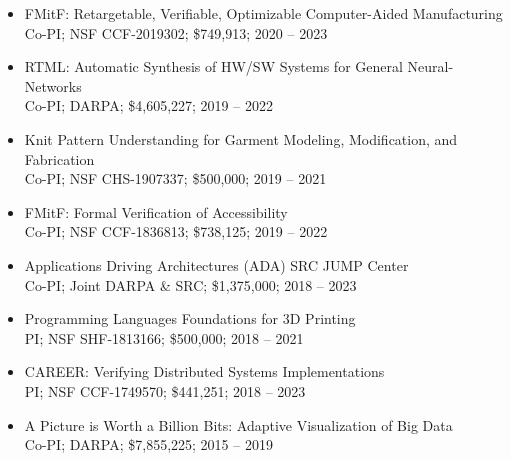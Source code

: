 \documentclass[10pt]{article}
\begin{document}
\begin{itemize}
  \item
    FMitF: Retargetable, Verifiable, Optimizable Computer-Aided Manufacturing \\
    Co-PI; NSF CCF-2019302; \$749,913; 2020 -- 2023

  \item
    RTML: Automatic Synthesis of HW/SW Systems for General Neural-Networks \\
    Co-PI; DARPA; \$4,605,227; 2019 -- 2022

  \item
    Knit Pattern Understanding for Garment Modeling, Modification, and Fabrication \\
    Co-PI; NSF CHS-1907337; \$500,000; 2019 -- 2021

  \item
    FMitF: Formal Verification of Accessibility \\
    Co-PI; NSF CCF-1836813; \$738,125; 2019 -- 2022

  \item
    Applications Driving Architectures (ADA) SRC JUMP Center \\
    Co-PI; Joint DARPA \& SRC; \$1,375,000; 2018 -- 2023

  \item
    Programming Languages Foundations for 3D Printing \\
    PI; NSF SHF-1813166; \$500,000; 2018 -- 2021

  \item
    CAREER: Verifying Distributed Systems Implementations \\
    PI; NSF CCF-1749570; \$441,251; 2018 -- 2023

  \item
    A Picture is Worth a Billion Bits: Adaptive Visualization of Big Data \\
    Co-PI; DARPA; \$7,855,225; 2015 -- 2019
\end{itemize}
\end{document}
